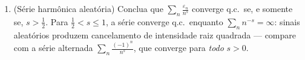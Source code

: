 \begin{problem}
\begin{enumerate}[resume]
\[        \P\bigl(Z > \theta\,\E Z\bigr) \;\geq\; (1 -
        \theta)^2\,\frac{(\E Z)^2}{\E Z^2}
        \]
        \emph{(separe $\E Z$ no nível $\theta\E Z$ e aplique
        Cauchy--Schwarz à peça superior)}.
        (b) Mostre que $\E T_n^4 \leq 3s_n^4$.
        (c) Deduza $\P\bigl(\abs{T_n} > \frac{s_n}2\bigr)
        \geq \frac3{16}$ e conclua que $\sum_nx_n\varepsilon_n$ diverge q.c.; donde a
        dicotomia
        \[
        \sum_nx_n\varepsilon_n\ \text{converge q.c.}
        \iff \sum_nx_n^2 < \infty .
        \]
  \item (Série harmônica aleatória) Conclua que $\sum_n\frac{\varepsilon_n}{n^s}$ converge q.c.\ se,
        e somente se, $s > \frac12$. Para $\frac12 < s \leq
        1$, a série converge q.c.\ enquanto
        $\sum_nn^{-s} = \infty$: sinais aleatórios produzem cancelamento de intensidade
        raiz quadrada --- compare com a série alternada $\sum_n\frac{(-1)^n}{n^s}$, que
        converge para \emph{todo} $s > 0$.
\end{enumerate}


\end{problem}
